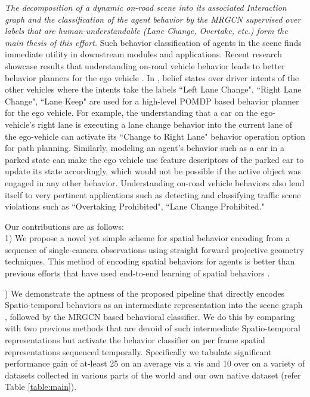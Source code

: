 \documentclass[letterpaper, 10 pt, conference]{ieeeconf}
\begin{document}
\textit{The decomposition of a dynamic on-road scene into its associated Interaction graph and the classification of the agent behavior by the MRGCN supervised over labels that are human-understandable (Lane Change, Overtake, etc.) form the main thesis of this effort.} Such behavior classification of agents in the scene finds immediate utility in downstream modules and applications. Recent research showcase results that understanding on-road vehicle behavior leads to better behavior planners for the ego vehicle \cite{meghjani2019context}. In \cite{meghjani2019context}, belief states over driver intents of the other vehicles where the intents take the labels ``Left Lane Change", ``Right Lane Change", ``Lane Keep" are used for a high-level POMDP based behavior planner for the ego vehicle. For example, the understanding that a car on the ego-vehicle's right lane is executing a lane change behavior into the current lane of the ego-vehicle can activate its ``Change to Right Lane" behavior operation option for path planning. Similarly, modeling an agent's behavior such as a car in a parked state can make the ego vehicle use feature descriptors of the parked car to update its state accordingly, which would not be possible if the active object was engaged in any other behavior. Understanding on-road vehicle behaviors also lend itself to very pertinent applications such as detecting and classifying traffic scene violations such as ``Overtaking Prohibited", ``Lane Change Prohibited." 

Our contributions are as follows:\\
1) We propose a novel yet simple scheme for spatial behavior encoding from a sequence of single-camera observations using straight forward projective geometry techniques. This method of encoding spatial behaviors for agents is better than previous efforts that have used end-to-end learning of spatial behaviors \cite{mylavarapu2020accurate}.

) We demonstrate the aptness of the proposed pipeline that directly encodes Spatio-temporal behaviors as an intermediate representation into the scene graph , followed by the MRGCN based behavioral classifier. We do this by comparing with two previous methods \cite{mylavarapu2020accurate, jain2016structural} that are devoid of such intermediate Spatio-temporal representations but activate the behavior classifier on per frame spatial representations sequenced temporally.  Specifically we tabulate significant performance gain of at-least 25 on an average vis a vis \cite{jain2016structural} and 10 over \cite{mylavarapu2020accurate} on a variety of datasets collected in various parts of the world \cite{Geiger2013IJRR, huang2018apolloscape, 360LiDARTracking_ICRA_2019} and our own native dataset (refer Table \ref{table:main}).
\end{document}
